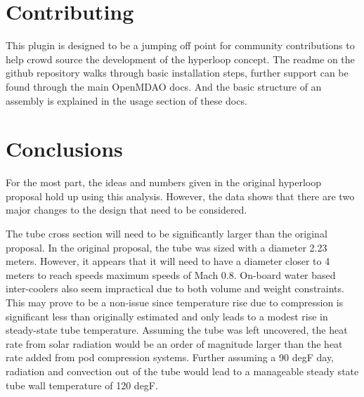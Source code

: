 \documentclass[heading.tex]{subfiles}
\begin{document}
\section{Contributing}
This plugin is designed to be a jumping off point for community contributions to help crowd source the development of the hyperloop
concept. The readme on the github repository walks through basic installation steps, further support can be found through the main
OpenMDAO docs. And the basic structure of an assembly is explained in the usage section of these docs.

\section{Conclusions}
For the most part, the ideas and numbers given in the original hyperloop proposal hold up using this analysis. However, the data shows that
there are two major changes to the design that need to be considered.

The tube cross section will need to be significantly larger than the original proposal. In the original proposal, the tube was sized with a diameter 2.23
meters. However, it appears that it will need to have a diameter closer to 4 meters to reach speeds maximum speeds of Mach 0.8.
On-board water based inter-coolers also seem impractical due to both volume and weight constraints. This may prove to be a non-issue since
temperature rise due to compression is significant less than originally estimated and only leads to a modest rise in steady-state tube
temperature. Assuming the tube was left uncovered, the heat rate from solar radiation would be an order of magnitude larger than the heat
rate added from pod compression systems. Further assuming a 90 degF day, radiation and convection out of the tube would lead to a
manageable steady state tube wall temperature of 120 degF.

\end{document}
